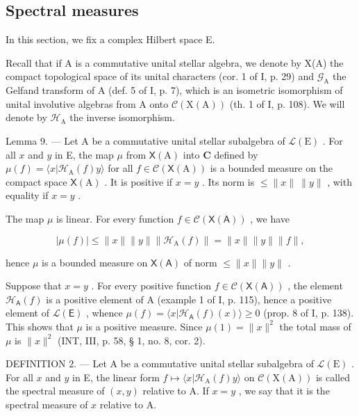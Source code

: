 \subsection{Spectral measures}

In this section, we fix a complex Hilbert space E.

Recall that if A is a commutative unital stellar algebra, we denote by X(A) the compact topological space of its unital characters (cor. 1 of I, p. 29) and \(\mathcal{G}_{\mathrm{A}}\) the Gelfand transform of A (def. 5 of I, p. 7), which is an isometric isomorphism of unital involutive algebras from A onto \(\mathcal{C}(\mathrm{X}(\mathrm{A}))\) (th. 1 of I, p. 108). We will denote by \(\mathcal{H}_{\mathrm{A}}\) the inverse isomorphism.

Lemma 9. --- Let A be a commutative unital stellar subalgebra of \(\mathcal{L}(\mathrm{E})\) . For all \(x\) and \(y\) in E, the map \(\mu\) from \(\mathsf{X}(\mathrm{A})\) into \(\mathbf{C}\) defined by \(\mu(f) = \langle x | \mathcal{H}_{\mathrm{A}}(f)y \rangle\) for all \(f \in \mathcal{C}(\mathsf{X}(\mathrm{A}))\) is a bounded measure on the compact space \(\mathsf{X}(\mathrm{A})\) . It is positive if \(x = y\) . Its norm is \(\leqslant \|x\|\ \|y\|\) , with equality if \(x = y\) .

The map \(\mu\) is linear. For every function \(f\in\mathcal{C}(\mathsf{X}(\mathsf{A}))\) , we have

\[
| \mu (f) | \leqslant \| x \| \| y \| \| \mathcal {H} _ {\mathrm{A}} (f) \| = \| x \| \| y \| \| f \|,
\]

hence \(\mu\) is a bounded measure on \(\mathsf{X}(\mathsf{A})\) of norm \(\leqslant \| x\|\| y\|\) .

Suppose that \(x = y\) . For every positive function \(f \in \mathcal{C}(\mathsf{X}(\mathsf{A}))\) , the element \(\mathcal{H}_{\mathsf{A}}(f)\) is a positive element of A (example 1 of I, p. 115), hence a positive element of \(\mathcal{L}(\mathsf{E})\) , whence \(\mu(f) = \langle x | \mathcal{H}_{\mathsf{A}}(f)(x) \rangle \geqslant 0\) (prop. 8 of I, p. 138). This shows that \(\mu\) is a positive measure. Since \(\mu(1) = \|x\|^2\) the total mass of \(\mu\) is \(\|x\|^2\) (INT, III, p. 58, § 1, no. 8, cor. 2).

DEFINITION 2. --- Let A be a commutative unital stellar subalgebra of \(\mathcal{L}(\mathrm{E})\) . For all \(x\) and \(y\) in E, the linear form \(f \mapsto \langle x | \mathcal{H}_{\mathrm{A}}(f)y \rangle\) on \(\mathcal{C}(\mathrm{X}(\mathrm{A}))\) is called the spectral measure of \((x,y)\) relative to A. If \(x = y\) , we say that it is the spectral measure of \(x\) relative to A.

